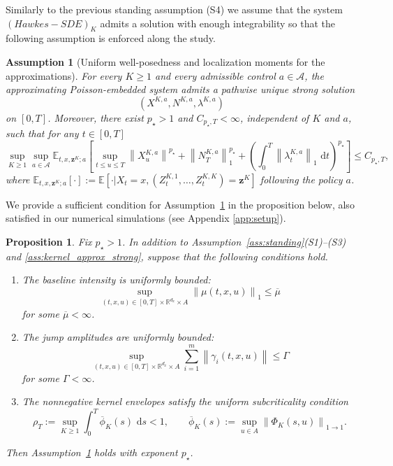 \documentclass[11pt]{article}
\newtheorem{assumption}{Assumption}[section]
\newtheorem{proposition}[theorem]{Proposition}
\theoremstyle{remarkitalic}
\theoremstyle{remarkitalic}
\newcommand{\R}{\mathbb R}
\newcommand{\E}{\mathbb E}
\newcommand{\dd}{\,\mathrm d}
\newcommand{\1}{\mathbf 1}
\newcommand{\norm}[1]{\left\lVert #1 \right\rVert}
\begin{document}
Similarly to the previous standing assumption (S4) we assume that the system $(Hawkes-SDE)_K$ admits a solution with enough integrability so that the following assumption is enforced along the study.  


\begin{assumption}[Uniform well-posedness and localization moments
for the approximations]
\label{ass:approx_uniform_moments}
For every $K\geq1$ and every admissible control
$a\in\mathcal A$, the approximating Poisson-embedded system admits
a pathwise unique strong solution
\[
    (X^{K,a},N^{K,a},\lambda^{K,a})
\]
on $[0,T]$. Moreover, there exist $p_\star>1$ and $C_{p_\star,T}<\infty$, independent of
$K$ and $a$, such that for any $t\in [0,T]$
\[
\sup_{K\geq1}\sup_{a\in\mathcal A}
\E_{t,x,\mathbf z^K;a}\left[
    \sup_{t\leq u\leq T}\norm{X_u^{K,a}}^{p_\star}
    +
    \norm{N_T^{K,a}}_1^{p_\star}
    +
    \left(
        \int_0^T\norm{\lambda_t^{K,a}}_1\,\dd t
    \right)^{p_\star}
\right]
\leq
C_{p_\star,T},
\]
where $\E_{t,x,\mathbf z^K;a}[\cdot]:=\mathbb E[\cdot|X_t=x, (Z_t^{K,1},\dots,Z_t^{K,K})=\mathbf z^K]$ following the policy $a$.
\end{assumption}
We provide a sufficient condition for
Assumption~\ref{ass:approx_uniform_moments} in the proposition below, also satisfied in our numerical simulations (see Appendix \ref{app:setup}).
\begin{proposition}
\label{prop:sufficient_approx_uniform_moments}
Fix $p_\star>1$. In addition to
Assumption~\ref{ass:standing}(S1)--(S3) and \ref{ass:kernel_approx_strong}, suppose that the following conditions hold.

\begin{enumerate}

    \item[(i)] The baseline intensity is uniformly bounded:
    \[
        \sup_{(t,x,u)\in[0,T]\times\R^{d_x}\times A}
        \norm{\mu(t,x,u)}_1
        \leq \overline\mu
    \]
    for some $\overline\mu<\infty$.

    \item[(ii)] The jump amplitudes are uniformly bounded:
    \[
        \sup_{(t,x,u)\in[0,T]\times\R^{d_x}\times A}
        \sum_{i=1}^m\norm{\gamma_i(t,x,u)}
        \leq \Gamma
    \]
    for some $\Gamma<\infty$.

    \item[(iii)] The nonnegative kernel envelopes satisfy the uniform
    subcriticality condition
    \[
        \rho_T
        :=
        \sup_{K\geq1}
        \int_0^T\overline\phi_K(s)\,\dd s
        <1,
        \qquad
        \overline\phi_K(s)
        :=
        \sup_{u\in A}
        \norm{\Phi_K(s,u)}_{1\to1}.
    \]
\end{enumerate}

Then Assumption~\ref{ass:approx_uniform_moments} holds with exponent
$p_\star$.
\end{proposition}
\end{document}
